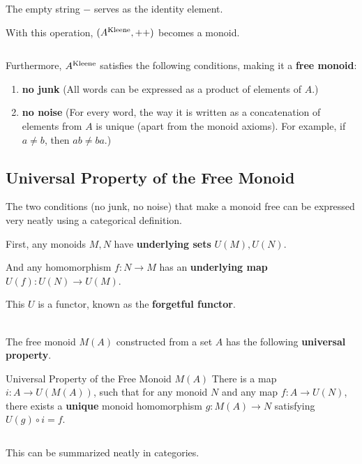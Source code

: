 \documentclass[uplatex,a4j,12pt,dvipdfmx]{jsarticle}
\begin{document}
The empty string $-$ serves as the identity element.

With this operation, $(A^{\rm Kleene}, ++)$ becomes a monoid.

${}$

Furthermore, $A^{\rm Kleene}$ satisfies the following conditions, making it a \textbf{free monoid}:
\begin{enumerate}
	\item \textbf{no junk} (All words can be expressed as a product of elements of $A$.)
	\item \textbf{no noise} (For every word, the way it is written as a concatenation of elements from $A$ is unique (apart from the monoid axioms). For example, if $a \neq b$, then $ab \neq ba$.)
\end{enumerate}

\subsection{Universal Property of the Free Monoid}

The two conditions (no junk, no noise) that make a monoid free can be expressed very neatly using a categorical definition.

First, any monoids $M, N$ have \textbf{underlying sets} $U(M), U(N)$.

And any homomorphism $f: N \to M$ has an \textbf{underlying map} $U(f) : U(N) \to U(M)$.

This $U$ is a functor, known as the \textbf{forgetful functor}.

\ \\

The free monoid $M(A)$ constructed from a set $A$ has the following \textbf{universal property}.

\begin{itembox}[l]{Universal Property of the Free Monoid $M(A)$}
	There is a map $i: A \to U(M(A))$, such that for any monoid $N$ and any map $f: A \to U(N)$,
	there exists a \textbf{unique} monoid homomorphism $g: M(A) \to N$ satisfying $U(g) \circ i = f$.
\end{itembox}

${}$

This can be summarized neatly in categories.

${}$
\end{document}
